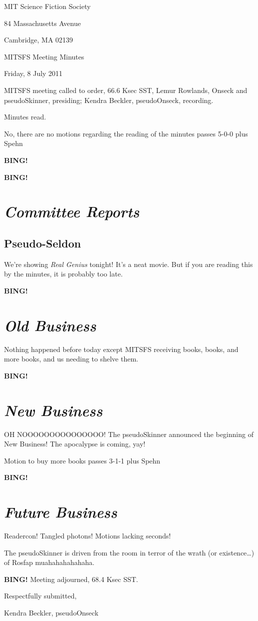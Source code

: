 \documentclass[10pt]{article}
\newcommand{\bing}{{\bf BING!} }
\newcommand{\goto}[1]{\bing \vskip 12pt \section*{{\em{#1}}}}
\newcommand{\ps}{ plus Spehn\xspace}
\newcommand{\skinner}{Lemur Rowlands, Onseck and pseudoSkinner}
\newcommand{\onseck}{Kendra Beckler, pseudoOnseck}
\newcommand{\meetingdate}{Friday, 8 July 2011}
\begin{document}
\begin{center}

MIT Science Fiction Society

84 Massachusetts Avenue

Cambridge, MA 02139

\vspace{12pt}

MITSFS Meeting Minutes

\meetingdate

\end{center}

\vspace{18pt}

\setlength{\parskip}{6pt}

\noindent
MITSFS meeting called to order, 66.6 Ksec SST,
\skinner, presiding; \onseck, recording.

Minutes read.

No, there are no motions regarding the reading of the minutes passes 5-0-0 \ps

\bing

\goto{Committee Reports}

\subsection*{Pseudo-Seldon}

We're showing \textit{Real Genius} tonight!  It's a neat movie.  But if you are reading this by the minutes, it is probably too late.

\goto{Old Business}

Nothing happened before today except MITSFS receiving books, books, and more books, and us needing to shelve them.

\goto{New Business}

OH NOOOOOOOOOOOOOOO!  The pseudoSkinner announced the beginning of New Business!  The apocalypse is coming, yay!

Motion to buy more books passes 3-1-1 \ps

\goto{Future Business}

Readercon!  Tangled photons!  Motions lacking seconds!

The pseudoSkinner is driven from the room in terror of the wrath (or existence\ldots) of Rosfap muahahahahahaha.

\bing
\noindent
Meeting adjourned, 68.4 Ksec SST.

\vspace{18pt}

\centerline{Respectfully submitted,}
\centerline{\onseck}
\end{document}
